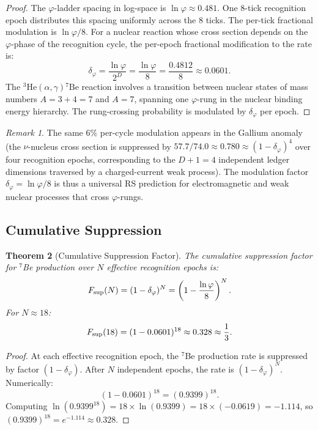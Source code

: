 \documentclass[12pt,a4paper]{article}
\newtheorem{theorem}{Theorem}[section]
\theoremstyle{definition}
\theoremstyle{remark}
\newtheorem{remark}[theorem]{Remark}
\begin{document}
\begin{proof}
The $\varphi$-ladder spacing in log-space is $\ln\varphi \approx 0.481$.
One 8-tick recognition epoch distributes this spacing uniformly across
the 8 ticks.  The per-tick fractional modulation is $\ln\varphi/8$.
For a nuclear reaction whose cross section depends on the $\varphi$-phase
of the recognition cycle, the per-epoch fractional modification to the
rate is:
\[
  \delta_\varphi = \frac{\ln\varphi}{2^D}
  = \frac{\ln\varphi}{8}
  = \frac{0.4812}{8}
  \approx 0.0601.
\]
The ${}^3\mathrm{He}(\alpha,\gamma){}^7\mathrm{Be}$ reaction involves a
transition between nuclear states of mass numbers $A = 3 + 4 = 7$
and $A = 7$, spanning one $\varphi$-rung in the nuclear binding energy
hierarchy.  The rung-crossing probability is modulated by
$\delta_\varphi$ per epoch.
\end{proof}

\begin{remark}
The same $6\%$ per-cycle modulation appears in the Gallium anomaly
(the $\nu$-nucleus cross section is suppressed by $57.7/74.0 \approx
0.780 \approx (1 - \delta_\varphi)^4$ over four recognition epochs,
corresponding to the $D+1 = 4$ independent ledger dimensions traversed
by a charged-current weak process).
The modulation factor $\delta_\varphi = \ln\varphi/8$ is thus a
universal RS prediction for electromagnetic and weak nuclear processes
that cross $\varphi$-rungs.
\end{remark}

\subsection{Cumulative Suppression}

\begin{theorem}[Cumulative Suppression Factor]
\label{thm:cumulative}
The cumulative suppression factor for $^7$Be production over $N$
effective recognition epochs is:
\begin{equation}
  F_{\rm sup}(N) = (1 - \delta_\varphi)^N = \left(1 - \frac{\ln\varphi}{8}\right)^N.
\end{equation}
For $N \approx 18$:
\begin{equation}
  F_{\rm sup}(18) = (1 - 0.0601)^{18} \approx 0.328 \approx \frac{1}{3}.
\end{equation}
\end{theorem}

\begin{proof}
At each effective recognition epoch, the $^7$Be production rate is
suppressed by factor $(1 - \delta_\varphi)$.  After $N$ independent
epochs, the rate is $(1 - \delta_\varphi)^N$.  Numerically:
\[
  (1 - 0.0601)^{18} = (0.9399)^{18}.
\]
Computing $\ln(0.9399^{18}) = 18 \times \ln(0.9399) = 18 \times
(-0.0619) = -1.114$, so $(0.9399)^{18} = e^{-1.114} \approx 0.328$.
\end{proof}
\end{document}

